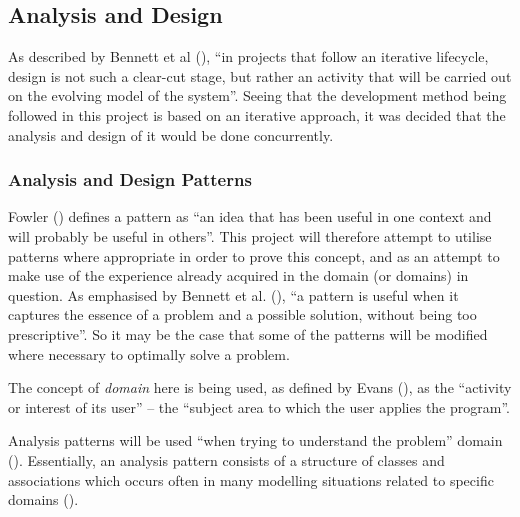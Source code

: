 \subsection{Analysis and Design} 
As described by Bennett et al (\citeyear[][p.~348]{bennett2010object}), ``in
projects that follow an iterative lifecycle, design is not such a clear-cut
stage, but rather an activity that will be carried out on the evolving model of
the system''. Seeing that the development method being followed in this project
is based on an iterative approach, it was decided that the analysis and design
of it would be done concurrently.

\subsubsection{Analysis and Design Patterns}
Fowler (\citeyear[][Section~1.3]{fowler1997analysis}) defines a pattern as ``an
idea that has been useful in one context and will probably be useful in
others''. This project will therefore attempt to utilise patterns where
appropriate in order to prove this concept, and as an attempt to make use of
the experience already acquired in the domain (or domains) in question. As
emphasised by Bennett et al. (\citeyear[][p.~252]{bennett2010object}), ``a
pattern is useful when it captures the essence of a problem and a possible
solution, without being too prescriptive''. So it may be the case that some of
the patterns will be modified where necessary to optimally solve a problem.

The concept of \emph{domain} here is being used, as defined by Evans
(\citeyear[][p.~2]{evans2004domain}), as the ``activity or interest of its
user'' -- the ``subject area to which the user applies the program''.

Analysis patterns will be used ``when trying to understand the problem'' domain
(\cite[][Section~1.1]{fowler1997analysis}). Essentially, an analysis pattern
consists of a structure of classes and associations which occurs often in many
modelling situations related to specific domains
(\cite[][p.~254]{bennett2010object}).
